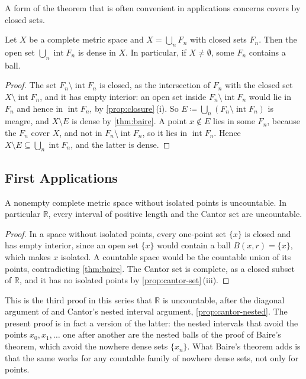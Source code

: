 A form of the theorem that is often convenient in applications concerns covers by closed sets.

\begin{corollary}
\label{cor:baire-closed-cover}
Let $X$ be a complete metric space and $X=\bigcup_nF_n$ with closed sets $F_n$. Then the open set $\bigcup_n\operatorname{int}F_n$ is dense in $X$. In particular, if $X\ne\emptyset$, some $F_n$ contains a ball.
\end{corollary}

\begin{proof}
The set $F_n\setminus\operatorname{int}F_n$ is closed, as the intersection of $F_n$ with the closed set $X\setminus\operatorname{int}F_n$, and it has empty interior: an open set inside $F_n\setminus\operatorname{int}F_n$ would lie in $F_n$ and hence in $\operatorname{int}F_n$, by \cref{prop:closure}\,(i). So $E\coloneqq\bigcup_n(F_n\setminus\operatorname{int}F_n)$ is meagre, and $X\setminus E$ is dense by \cref{thm:baire}. A point $x\notin E$ lies in some $F_n$, because the $F_n$ cover $X$, and not in $F_n\setminus\operatorname{int}F_n$, so it lies in $\operatorname{int}F_n$. Hence $X\setminus E\subseteq\bigcup_n\operatorname{int}F_n$, and the latter is dense.
\end{proof}

\subsection{First Applications}

\begin{corollary}
\label{cor:perfect-uncountable}
A nonempty complete metric space without isolated points is uncountable. In particular $\mathbb R$, every interval of positive length and the Cantor set are uncountable.
\end{corollary}

\begin{proof}
In a space without isolated points, every one-point set $\{x\}$ is closed and has empty interior, since an open set $\{x\}$ would contain a ball $B(x,r)=\{x\}$, which makes $x$ isolated. A countable space would be the countable union of its points, contradicting \cref{thm:baire}. The Cantor set is complete, as a closed subset of $\mathbb R$, and it has no isolated points by \cref{prop:cantor-set}\,(iii).
\end{proof}

This is the third proof in this series that $\mathbb R$ is uncountable, after the diagonal argument of  and Cantor's nested interval argument, \cref{prop:cantor-nested}. The present proof is in fact a version of the latter: the nested intervals that avoid the points $x_0,x_1,\ldots$ one after another are the nested balls of the proof of Baire's theorem, which avoid the nowhere dense sets $\{x_n\}$. What Baire's theorem adds is that the same works for any countable family of nowhere dense sets, not only for points.

